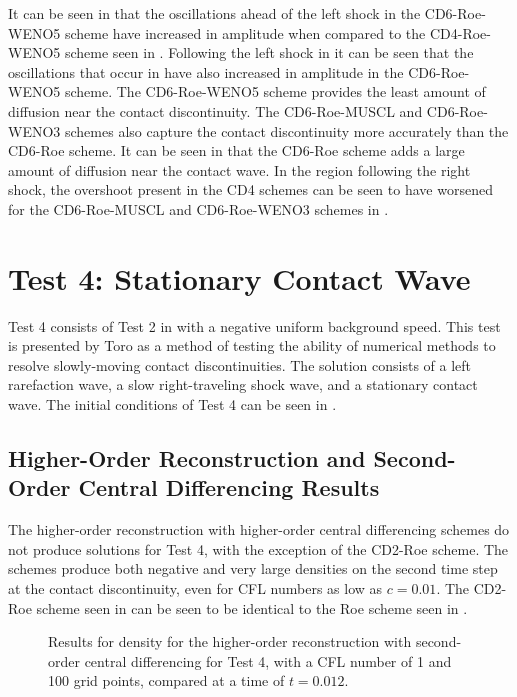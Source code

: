 It can be seen in  that the oscillations ahead of the left shock in the CD6-Roe-WENO5 scheme have increased in amplitude when compared to the CD4-Roe-WENO5 scheme seen in . Following the left shock in  it can be seen that the oscillations that occur in  have also increased in amplitude in the CD6-Roe-WENO5 scheme. The CD6-Roe-WENO5 scheme provides the least amount of diffusion near the contact discontinuity. The CD6-Roe-MUSCL and CD6-Roe-WENO3 schemes also capture the contact discontinuity more accurately than the CD6-Roe scheme. It can be seen in  that the CD6-Roe scheme adds a large amount of diffusion near the contact wave. In the region following the right shock, the overshoot present in the CD4 schemes can be seen to have worsened for the CD6-Roe-MUSCL and CD6-Roe-WENO3 schemes in .

\section{Test 4: Stationary Contact Wave}
Test 4 consists of Test 2 in  with a negative uniform background speed. This test is presented by Toro \cite{toro2013riemann} as a method of testing the ability of numerical methods to resolve slowly-moving contact discontinuities. The solution consists of a left rarefaction wave, a slow right-traveling shock wave, and a stationary contact wave. The initial conditions of Test 4 can be seen in .

\subsection{Higher-Order Reconstruction and Second-Order Central Differencing Results}

The higher-order reconstruction with higher-order central differencing schemes do not produce solutions for Test 4, with the exception of the CD2-Roe scheme. The schemes produce both negative and very large densities on the second time step at the contact discontinuity, even for CFL numbers as low as $c=0.01$.  The CD2-Roe scheme seen in  can be seen to be identical to the Roe scheme seen in .
\begin{figure}
	\caption[Results for density for the higher-order reconstruction with second-order central differencing for Test 4, with a CFL number of 1 and 100 grid points, compared at a time of $t=0.012$.]{Results for density for the higher-order reconstruction with second-order central differencing for Test 4, with a CFL number of 1 and 100 grid points, compared at a time of $t=0.012$.}
	\label{fig:Test5HORCD2density}
\end{figure}

